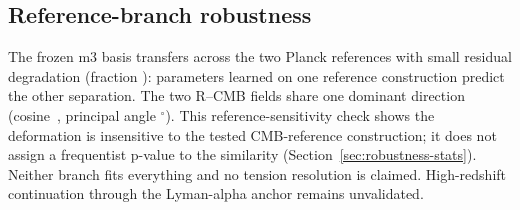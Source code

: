 \subsection{Reference-branch robustness}

The frozen m3 basis transfers across the two Planck references with small
residual degradation (fraction \GeometryTransferDegradation{}):
parameters learned on
one reference construction predict the other separation. The two R--CMB fields
share one dominant direction
(cosine~\GeometryCosineSimilarity{}, principal angle
\GeometryPrincipalAngle$^{\circ}$). This reference-sensitivity
check shows the deformation is insensitive to the tested
CMB-reference construction; it does not assign a frequentist
p-value to the similarity (Section~\ref{sec:robustness-stats}).
Neither branch fits everything and no tension resolution is claimed.
High-redshift continuation through the
Lyman-alpha anchor remains unvalidated.
